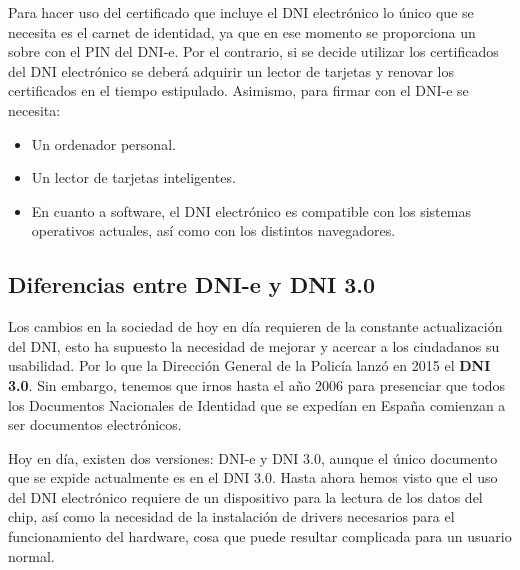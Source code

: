 \documentclass{manual}
\begin{document}
Para hacer uso del certificado que incluye el DNI electrónico lo único que se necesita es el carnet de identidad, ya que en ese momento se proporciona un sobre con el PIN del DNI-e. Por el contrario, si se decide utilizar los certificados del DNI electrónico se deberá adquirir un lector de tarjetas y renovar los certificados en el tiempo estipulado. Asimismo, para firmar con el DNI-e se necesita:

\begin{itemize}
	\item Un ordenador personal.
	\item Un lector de tarjetas inteligentes. %
	\item En cuanto a software, el DNI electrónico es compatible con los sistemas operativos actuales, así como con los distintos navegadores. 
\end{itemize}






\subsection{Diferencias entre DNI-e y DNI 3.0}


Los cambios en la sociedad de hoy en día requieren de la constante actualización del DNI, esto ha supuesto la necesidad de mejorar y acercar a los ciudadanos su usabilidad. Por lo que la Dirección General de la Policía lanzó en 2015 el \textbf{DNI 3.0}. Sin embargo, tenemos que irnos hasta el año 2006 para presenciar que todos los Documentos Nacionales de Identidad que se expedían en España comienzan a ser documentos electrónicos. 

Hoy en día, existen dos versiones: DNI-e y DNI 3.0, aunque el único documento que se expide actualmente es en el DNI 3.0. Hasta ahora hemos visto que el uso del DNI electrónico requiere de un dispositivo para la lectura de los datos del chip, así como la necesidad de la instalación de drivers necesarios para el funcionamiento del hardware, cosa que puede resultar complicada para un usuario normal.
\end{document}
